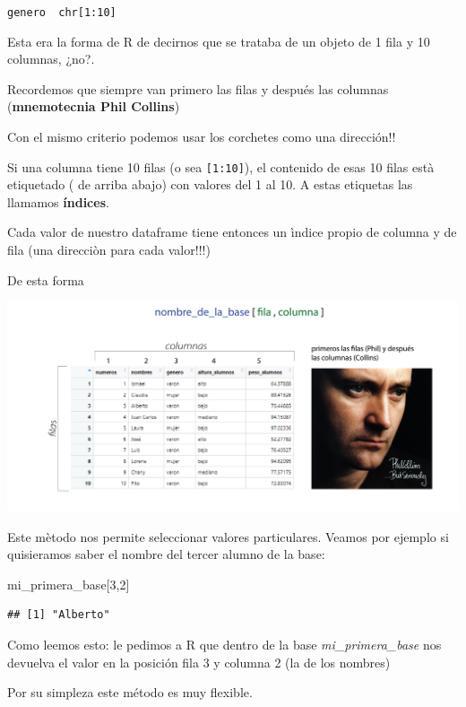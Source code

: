\documentclass[
]{book}
\newenvironment{Shaded}{\begin{snugshade}}{\end{snugshade}}
\newcommand{\DecValTok}[1]{\textcolor[rgb]{0.00,0.00,0.81}{#1}}
\newcommand{\NormalTok}[1]{#1}
\begin{document}
\texttt{genero\ \textbar{}\ chr{[}1:10{]}}

Esta era la forma de R de decirnos que se trataba de un objeto de 1 fila y 10 columnas, ¿no?.

Recordemos que siempre van primero las filas y después las columnas (\textbf{mnemotecnia Phil Collins})

Con el mismo criterio podemos usar los corchetes como una dirección!!

Si una columna tiene 10 filas (o sea \texttt{{[}1:10{]}}), el contenido de esas 10 filas està etiquetado ( de arriba abajo) con valores del 1 al 10. A estas etiquetas las llamamos \textbf{índices}.

Cada valor de nuestro dataframe tiene entonces un ìndice propio de columna y de fila (una direcciòn para cada valor!!!)

De esta forma

\includegraphics{img/philcollins.png}

Este mètodo nos permite seleccionar valores particulares.
Veamos por ejemplo si quisieramos saber el nombre del tercer alumno de la base:

\begin{Shaded}
\begin{Highlighting}[]
\NormalTok{mi\_primera\_base[}\DecValTok{3}\NormalTok{,}\DecValTok{2}\NormalTok{]}
\end{Highlighting}
\end{Shaded}

\begin{verbatim}
## [1] "Alberto"
\end{verbatim}

Como leemos esto: le pedimos a R que dentro de la base \emph{mi\_primera\_base} nos devuelva el valor en la posición fila 3 y columna 2 (la de los nombres)

Por su simpleza este método es muy flexible.
\end{document}
